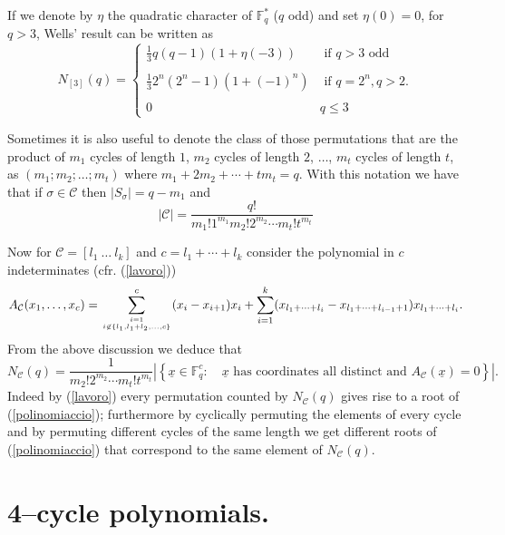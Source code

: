 \documentclass[10pt,a4paper,twoside]{article}
\def\Fq{{\mathbb{F}}_q}
\def\Cl{{\mathcal{C}}}
\newcommand{\sopra}[2]{\genfrac{}{}{0pt}{}{#1}{#2}}
\begin{document}
If we denote by $\eta$ the quadratic character of $\Fq^*$ ($q$
odd) and set $\eta(0)=0$, for $q>3$, Wells' result can be written as
$$
    N_{[3]}(q)=
\left\{
    \begin{array}{ll}
\frac{1}{3}q(q-1)\left(1+\eta(-3)\right) & \textrm{ if } q>3 \textrm{ odd }\\
    \\
    \frac{1}{3}2^n(2^n-1)(1+(-1)^n)    & \textrm{ if } q=2^n, q>2.
    \\
    \\ 0 & q\leq 3
    \end{array}
\right.
$$

Sometimes it is also useful to denote the class of those permutations
that are the product
of $m_1$  cycles of length $1$, $m_2$ cycles of length $2$, $\ldots$, $m_t$
cycles of length $t$,
as $(m_1;m_2;\ldots;m_t)$ where $m_1+2m_2+\cdots+tm_t=q$. With this notation
we have that if
$\sigma\in\Cl$ then $|S_\sigma|=q-m_1$ and
\begin{equation}\label{conjusize}
|\Cl|=\frac{q!}{m_1!1^{m_1}m_2!2^{m_2}\cdots m_t!t^{m_t}}
\end{equation}

Now for $\Cl=[l_1\ \ldots \ l_k]$ and $c=l_1+\cdots+l_k$ consider the
polynomial in
$c$ indeterminates (cfr. (\ref{lavoro}))
\begin{equation}\label{polinomiaccio}
A_{\Cl}(x_1,\ldots,x_c)=
\sum_{\sopra{i=1}{i\not\in \{l_1,l_1+l_2,\ldots, c\}}}^c (x_i-x_{i+1})x_i
+\sum_{i=1}^k(x_{l_1+\cdots+l_i}-x_{l_1+\cdots+l_{i-1}+1})x_{l_1+\cdots+l_{i}}.
\end{equation}
From the above discussion we deduce that
\begin{equation}
\label{gen2}
N_{\Cl}(q)=\frac{1}{m_2!2^{m_2}\cdots m_t!t^{m_t}}
\left|\left\{{\underline x}\in \Fq^{c}: \quad {\underline x}
\textrm{ has coordinates all distinct and }
A_{\Cl}({\underline x})=0
\right\}\right|.
\end{equation}
Indeed by (\ref{lavoro}) every permutation counted by $N_{\Cl}(q)$ gives rise
to a root of
(\ref{polinomiaccio}); furthermore by cyclically permuting the elements of every cycle
and by permuting
different cycles of the same length we get different roots of (\ref{polinomiaccio})
that correspond
to the same element of $N_{\Cl}(q)$.

\section{4--cycle polynomials.}
\end{document}

